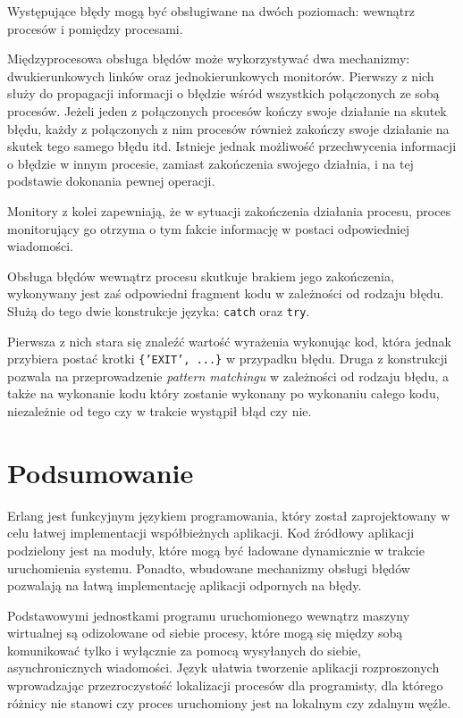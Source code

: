 Występujące błędy mogą być obsługiwane na dwóch poziomach: wewnątrz procesów i pomiędzy procesami.

Międzyprocesowa obsługa błędów może wykorzystywać dwa mechanizmy: dwukierunkowych linków oraz jednokierunkowych monitorów.
Pierwszy z nich służy do propagacji informacji o błędzie wśród wszystkich połączonych ze sobą procesów.
Jeżeli jeden z połączonych procesów kończy swoje działanie na skutek błędu, każdy z połączonych z nim procesów również zakończy swoje działanie na skutek tego samego błędu itd.
Istnieje jednak możliwość przechwycenia informacji o błędzie w innym procesie, zamiast zakończenia swojego działnia, i na tej podstawie dokonania pewnej operacji.

Monitory z kolei zapewniają, że w sytuacji zakończenia działania procesu, proces monitorujący go otrzyma o tym fakcie informację w postaci odpowiedniej wiadomości.

Obsługa błędów wewnątrz procesu skutkuje brakiem jego zakończenia, wykonywany jest zaś odpowiedni fragment kodu w zależności od rodzaju błędu. Służą do tego dwie konstrukcje języka: \texttt{catch} oraz \texttt{try}.

Pierwsza z nich stara się znaleźć wartość wyrażenia wykonując kod, która jednak przybiera postać krotki \texttt{\{'EXIT', ...\}} w przypadku błędu.
Druga z konstrukcji pozwala na przeprowadzenie \emph{pattern matchingu} w zależności od rodzaju błędu, a także na wykonanie kodu który zostanie wykonany po wykonaniu całego kodu, niezależnie od tego czy w trakcie wystąpił błąd czy nie.

\section{Podsumowanie}
\label{sec:erlangPodsumowanie}

Erlang jest funkcyjnym językiem programowania, który został zaprojektowany w celu łatwej implementacji współbieżnych aplikacji.
Kod źródłowy aplikacji podzielony jest na moduły, które mogą być ładowane dynamicznie w trakcie uruchomienia systemu.
Ponadto, wbudowane mechanizmy obsługi błędów pozwalają na łatwą implementację aplikacji odpornych na błędy.

Podstawowymi jednostkami programu uruchomionego wewnątrz maszyny wirtualnej są odizolowane od siebie procesy, które mogą się między sobą komunikować tylko i wyłącznie za pomocą wysyłanych do siebie, asynchronicznych wiadomości.
Język ułatwia tworzenie aplikacji rozproszonych wprowadzając przezroczystość lokalizacji procesów dla programisty, dla którego różnicy nie stanowi czy proces uruchomiony jest na lokalnym czy zdalnym węźle.
